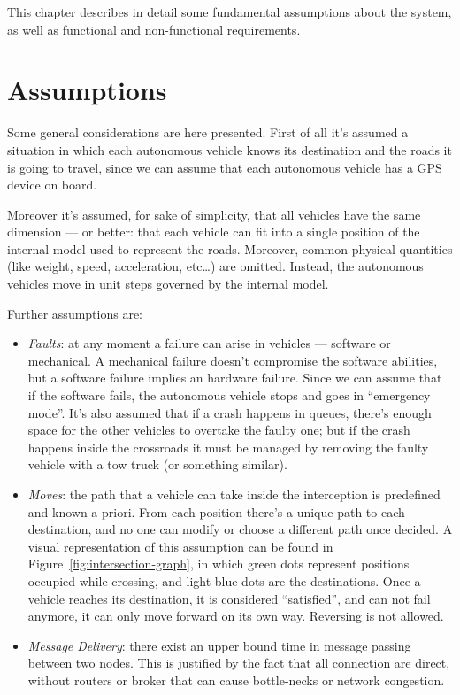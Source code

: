 \documentclass{memoir}
\begin{document}
This chapter describes in detail some fundamental assumptions about the system, as well as functional and non-functional requirements.

\section{Assumptions}

Some general considerations are here presented. First of all it's assumed a situation in which each autonomous vehicle knows its destination and the roads it is going to travel, since we can assume that each autonomous vehicle has a GPS device on board.

Moreover it's assumed, for sake of simplicity, that all vehicles have the same dimension --- or better: that each vehicle can fit into a single position of the internal model used to represent the roads. Moreover, common physical quantities (like weight, speed, acceleration, etc\dots) are omitted. Instead, the autonomous vehicles move in unit steps governed by the internal model.
\newline

Further assumptions are:

\begin{itemize}
	\item \emph{Faults}: at any moment a failure can arise in vehicles --- software or mechanical. A mechanical failure doesn't compromise the software abilities, but a software failure implies an hardware failure. Since we can assume that if the software fails, the autonomous vehicle stops and goes in ``emergency mode''. It's also assumed that if a crash happens in queues, there's enough space for the other vehicles to overtake the faulty one; but if the crash happens inside the crossroads it must be managed by removing the faulty vehicle with a tow truck (or something similar).
	\item \emph{Moves}: the path that a vehicle can take inside the interception is predefined and known a priori. From each position there's a unique path to each destination, and no one can modify or choose a different path once decided. A visual representation of this assumption can be found in Figure~\ref{fig:intersection-graph}, in which green dots represent positions occupied while crossing, and light-blue dots are the destinations. Once a vehicle reaches its destination, it is considered ``satisfied'', and can not fail anymore, it can only move forward on its own way. Reversing is not allowed.
	\item \emph{Message Delivery}: there exist an upper bound time in message passing between two nodes. This is justified by the fact that all connection are direct, without routers or broker that can cause bottle-necks or network congestion.
\end{itemize}
\end{document}

